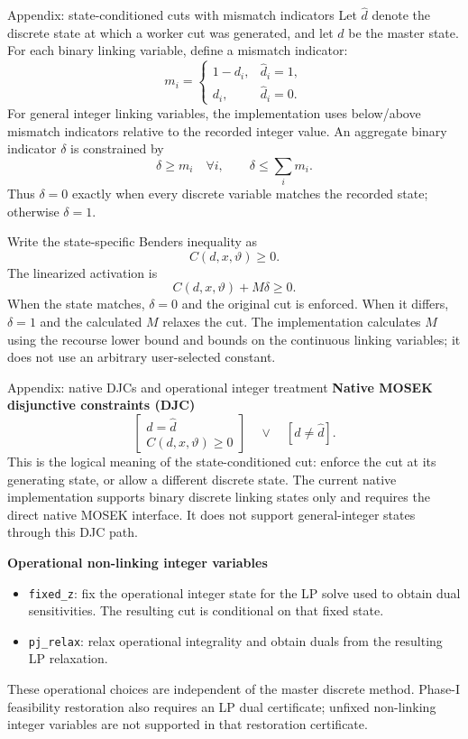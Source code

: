 \documentclass[aspectratio=169,10pt]{beamer}
\begin{document}
\begin{frame}{Appendix: state-conditioned cuts with mismatch indicators}
\small
Let $\hat d$ denote the discrete state at which a worker cut was generated, and let $d$ be the master state. For each binary linking variable, define a mismatch indicator:
\[
m_i =
\begin{cases}
1-d_i, & \hat d_i=1,\\
d_i, & \hat d_i=0.
\end{cases}
\]
For general integer linking variables, the implementation uses below/above mismatch indicators relative to the recorded integer value. An aggregate binary indicator $\delta$ is constrained by
\[
\delta\geq m_i\quad\forall i,\qquad
\delta\leq\sum_i m_i.
\]
Thus $\delta=0$ exactly when every discrete variable matches the recorded state; otherwise $\delta=1$.

Write the state-specific Benders inequality as
\[
C(d,x,\vartheta)\geq0.
\]
The linearized activation is
\[
C(d,x,\vartheta)+M\delta\geq0.
\]
When the state matches, $\delta=0$ and the original cut is enforced. When it differs, $\delta=1$ and the calculated $M$ relaxes the cut. The implementation calculates $M$ using the recourse lower bound and bounds on the continuous linking variables; it does not use an arbitrary user-selected constant.
\end{frame}

\begin{frame}{Appendix: native DJCs and operational integer treatment}
\small
\textbf{Native MOSEK disjunctive constraints (DJC)}
\[
\left[
\begin{array}{c}
d=\hat d\\
C(d,x,\vartheta)\geq0
\end{array}
\right]
\quad\lor\quad
[d\neq\hat d].
\]
This is the logical meaning of the state-conditioned cut: enforce the cut at its generating state, or allow a different discrete state. The current native implementation supports binary discrete linking states only and requires the direct native MOSEK interface. It does not support general-integer states through this DJC path.

\medskip
\textbf{Operational non-linking integer variables}
\begin{itemize}
\item \texttt{fixed\_z}: fix the operational integer state for the LP solve used to obtain dual sensitivities. The resulting cut is conditional on that fixed state.
\item \texttt{pj\_relax}: relax operational integrality and obtain duals from the resulting LP relaxation.
\end{itemize}
These operational choices are independent of the master discrete method. Phase-I feasibility restoration also requires an LP dual certificate; unfixed non-linking integer variables are not supported in that restoration certificate.
\end{frame}
\end{document}
